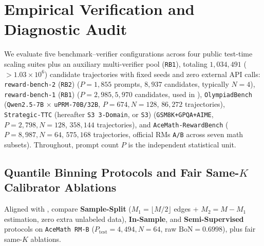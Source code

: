 \documentclass[10pt]{article}
\theoremstyle{plain}
\theoremstyle{definition}
\theoremstyle{remark}
\begin{document}
\section{Empirical Verification and Diagnostic Audit}
\label{sec:experiments}

We evaluate five benchmark--verifier configurations across four public test-time scaling suites plus an auxiliary multi-verifier pool (\texttt{RB1}), totaling $1{,}034{,}491$ ($>1.03\times 10^6$) candidate trajectories with fixed seeds and zero external API calls: \texttt{reward-bench-2} (\texttt{RB2}) \citep{malik2025rewardbench2} ($P=1{,}855$ prompts, $8{,}937$ candidates, typically $N=4$), \texttt{reward-bench-1} (\texttt{RB1}) \citep{lambert2024rewardbench} ($P=2{,}985, 5{,}970$ candidates, used in ), \texttt{OlympiadBench} \citep{he2024olympiadbench,gadetsky2026uprm} (\texttt{Qwen2.5-7B} $\times$ \texttt{uPRM-70B/32B}, $P=674, N=128$, $86{,}272$ trajectories), \texttt{Strategic-TTC} (hereafter \texttt{S3 3-Domain}, or \texttt{S3}) \citep{velasco2026ttcgames} (\texttt{GSM8K+GPQA+AIME}, $P=2{,}798, N=128$, $358{,}144$ trajectories), and \texttt{AceMath-RewardBench} \citep{liu2024acemath} ($P=8{,}987, N=64$, $575{,}168$ trajectories, official RMs \texttt{A/B} across seven math subsets). Throughout, prompt count $P$ is the independent statistical unit.

\subsection{Quantile Binning Protocols and Fair Same-\texorpdfstring{$K$}{K} Calibrator Ablations}

Aligned with ,  compare \textbf{Sample-Split} ($M_1 = \lfloor M/2\rfloor$ edges + $M_2 = M - M_1$ estimation, zero extra unlabeled data), \textbf{In-Sample}, and \textbf{Semi-Supervised} protocols on \texttt{AceMath RM-B} ($P_{\mathrm{test}}=4{,}494, N=64$, raw $\mathrm{BoN}=0.6998$), plus fair same-$K$ ablations.
\end{document}
